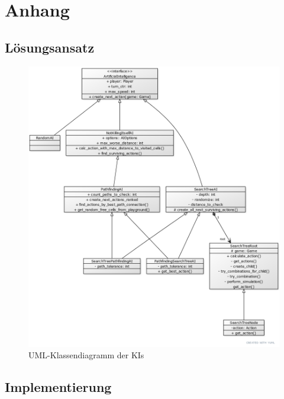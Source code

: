 \chapter{Anhang}
\label{ch:anhang}

\section{Lösungsansatz}
\label{sec:anhang-loesungsansatz}

\begin{figure}[htb]
\centering
\includegraphics[width=\textwidth]{Bilder/Klassendiagramm_AIs.png}
\caption{UML-Klassendiagramm der \ac{KI}s}
\label{fig:klassendiagramm-AIs}
\end{figure}

\section{Implementierung}
\label{sec:anhang-implementierung}

